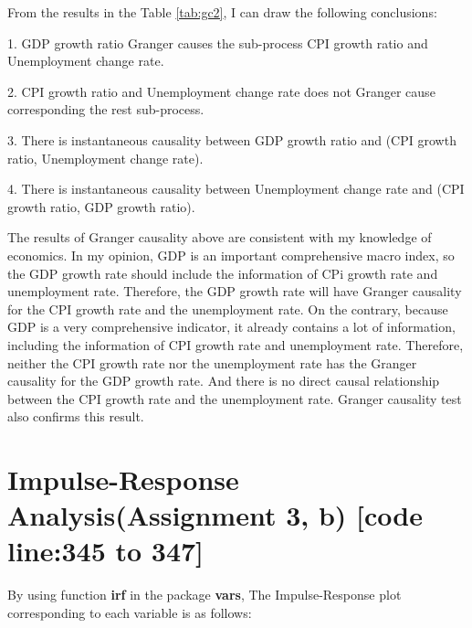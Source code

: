 \documentclass{report}
\begin{document}
From the results in the Table \ref{tab:gc2}, I can draw the following conclusions:

1. GDP growth ratio Granger causes the sub-process CPI growth ratio and Unemployment change rate.

2. CPI growth ratio and Unemployment change rate does not Granger cause corresponding the rest sub-process.

3. There is instantaneous causality between GDP growth ratio and (CPI growth ratio, Unemployment change rate).

4. There is instantaneous causality between Unemployment change rate and (CPI growth ratio, GDP growth ratio).

The results of Granger causality above are consistent with my knowledge of economics. In my opinion, GDP is an important comprehensive macro index, so the GDP growth rate should include the information of CPi growth rate and unemployment rate. Therefore, the GDP growth rate will have Granger causality for the CPI growth rate and the unemployment rate. On the contrary, because GDP is a very comprehensive indicator, it already contains a lot of information, including the information of CPI growth rate and unemployment rate. Therefore, neither the CPI growth rate nor the unemployment rate has the Granger causality for the GDP growth rate. And there is no direct causal relationship between the CPI growth rate and the unemployment rate. Granger causality test also confirms this result.

\section{Impulse-Response Analysis(Assignment 3, b) [code line:345 to 347]}

By using function \textbf{irf} in the package \textbf{vars}, The Impulse-Response plot corresponding to each variable is as follows:
\end{document}
